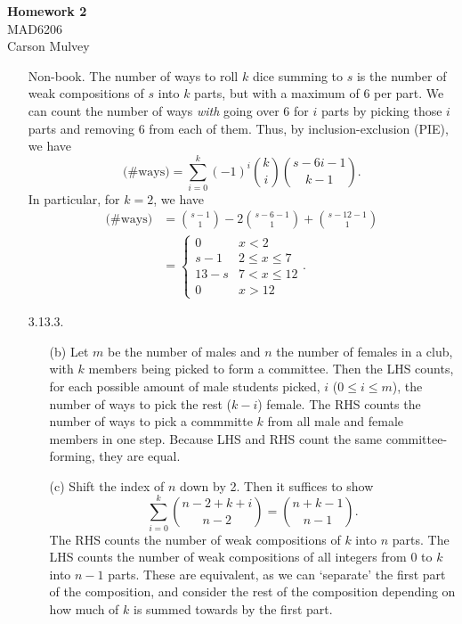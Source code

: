 \documentclass[11pt,letterpaper]{article}
\begin{document}
\begin{center}
    \begin{large}
        \textbf{Homework 2} \\
        MAD6206 \\
        Carson Mulvey
    \end{large}
\end{center}

\begin{enumerate}
    \item[Non-book.] The number of ways to roll $k$ dice summing to $s$ is the number of weak compositions of $s$ into $k$ parts, but with a maximum of 6 per part. We can count the number of ways \textit{with} going over 6 for $i$ parts by picking those $i$ parts and removing 6 from each of them. Thus, by inclusion-exclusion (PIE), we have
    \[
        \text{(\# ways)} = \sum_{i=0}^k (-1)^i\binom{k}{i}\binom{s-6i-1}{k-1}.
    \]
    In particular, for $k=2$, we have
    \begin{align*}
        \text{(\# ways)} &= \binom{s-1}{1} - 2\binom{s-6-1}{1} + \binom{s-12-1}{1} \\
        &= \begin{cases} 
            0 & x< 2 \\
            s-1 & 2\leq x\leq 7 \\
            13-s & 7 < x \leq 12 \\
            0 & x> 12
         \end{cases}
        .
    \end{align*}
    \item[3.13.3.]
\begin{enumerate}
    \item[(b)] Let $m$ be the number of males and $n$ the number of females in a club, with $k$ members being picked to form a committee. Then the LHS counts, for each possible amount of male students picked, $i$ ($0\leq i\leq m$), the number of ways to pick the rest ($k-i$) female. The RHS counts the number of ways to pick a commmitte $k$ from all male and female members in one step. Because LHS and RHS count the same committee-forming, they are equal.
    \item[(c)] Shift the index of $n$ down by 2. Then it suffices to show
    \[
        \sum_{i=0}^k{n-2+k+i\choose n-2} = {n+k-1\choose n-1}.
    \]
    The RHS counts the number of weak compositions of $k$ into $n$ parts. The LHS counts the number of weak compositions of all integers from 0 to $k$ into $n-1$ parts. These are equivalent, as we can `separate' the first part of the composition, and consider the rest of the composition depending on how much of $k$ is summed towards by the first part.

\end{enumerate}
\end{enumerate}
\end{document}
